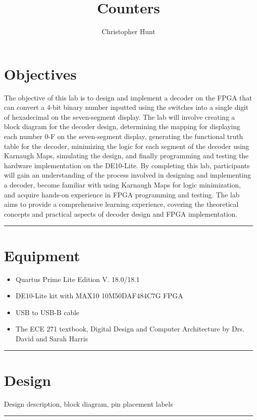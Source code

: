\documentclass{article}
\title{\textbf{{\huge Counters}}}
\author{Christopher Hunt}
\begin{document}
\pagestyle{fancy}
\fancyhf{}
\rhead{\thepage}
\maketitle
\section*{\textcolor{mycolor}{Objectives}}
The objective of this lab is to design and implement a decoder on the FPGA that can convert a 4-bit binary number inputted using the switches into a single digit of hexadecimal on the seven-segment display. The lab will involve creating a block diagram for the decoder design, determining the mapping for displaying each number 0-F on the seven-segment display, generating the functional truth table for the decoder, minimizing the logic for each segment of the decoder using Karnaugh Maps, simulating the design, and finally programming and testing the hardware implementation on the DE10-Lite. By completing this lab, participants will gain an understanding of the process involved in designing and implementing a decoder, become familiar with using Karnaugh Maps for logic minimization, and acquire hands-on experience in FPGA programming and testing. The lab aims to provide a comprehensive learning experience, covering the theoretical concepts and practical aspects of decoder design and FPGA implementation.
\vspace{5mm}
\hrule

\section*{\textcolor{mycolor}{Equipment}}
\begin{itemize}
  \item Quartus Prime Lite Edition V. 18.0/18.1
  \item DE10-Lite kit with MAX10 10M50DAF484C7G FPGA
  \item USB to USB-B cable
  \item The ECE 271 textbook, Digital Design and Computer Architecture by Drs. David and Sarah Harris
\end{itemize}
\vspace{5mm}
\hrule

\section*{\textcolor{mycolor}{Design}}
Design description, block diagram, pin placement labels
\vspace{5mm}
\hrule
\end{document}
